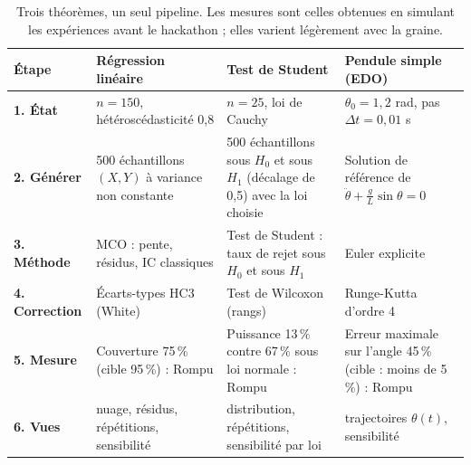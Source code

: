 \documentclass[11pt,a4paper]{article}
\begin{document}
\begin{table}[H]
  \centering
  \footnotesize
  \begin{tabularx}{\textwidth}{@{}L{2.5cm} Y Y Y@{}}
    \toprule
    \textbf{Étape} & \textbf{Régression linéaire} & \textbf{Test de Student} & \textbf{Pendule simple (EDO)} \\
    \midrule
    \textbf{1. État} &
    $n=150$, hétéroscédasticité 0,8 &
    $n=25$, loi de Cauchy &
    $\theta_0=1{,}2$ rad, pas $\Delta t = 0{,}01$ s \\
    \midrule
    \textbf{2. Générer} &
    500 échantillons $(X,Y)$ à variance non constante &
    500 échantillons sous $H_0$ et sous $H_1$ (décalage de 0,5) avec la loi choisie &
    Solution de référence de $\ddot{\theta} + \frac{g}{L}\sin\theta = 0$ \\
    \midrule
    \textbf{3. Méthode} &
    MCO : pente, résidus, IC classiques &
    Test de Student : taux de rejet sous $H_0$ et sous $H_1$ &
    Euler explicite \\
    \midrule
    \textbf{4. Correction} &
    Écarts-types HC3 (White) &
    Test de Wilcoxon (rangs) &
    Runge-Kutta d'ordre 4 \\
    \midrule
    \textbf{5. Mesure} &
    Couverture 75\,\% (cible 95\,\%) : Rompu &
    Puissance 13\,\% contre 67\,\% sous loi normale : Rompu &
    Erreur maximale sur l'angle 45\,\% (cible : moins de 5\,\%) : Rompu \\
    \midrule
    \textbf{6. Vues} &
    nuage, résidus, répétitions, sensibilité &
    distribution, répétitions, sensibilité par loi &
    trajectoires $\theta(t)$, sensibilité \\
    \bottomrule
  \end{tabularx}
  \caption{Trois théorèmes, un seul pipeline. Les mesures sont celles obtenues en simulant les expériences avant le hackathon ; elles varient légèrement avec la graine.}
\end{table}
\end{document}

